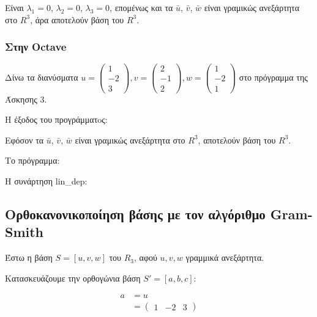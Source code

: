 \documentclass[12pt, fleqn, leqno]{extreport}
\begin{document}
Είναι $\lambda_{1}=0$, $\lambda_{2}=0$, $\lambda_{3}=0$, επομένως και τα $\bar{u}$, $\bar{v}$, $\bar{w}$ είναι γραμικώς ανεξάρτητα στο $R^{3}$, άρα αποτελούν βάση του $R^{3}$.

\newpage
\subsubsection{Στην Octave}

Δίνω τα διανύσματα
$
    u = \begin{pmatrix}
        1 \\ -2 \\ 3
    \end{pmatrix},
    v = \begin{pmatrix}
        2 \\ -1 \\ 2
    \end{pmatrix},
    w = \begin{pmatrix}
        1 \\ -2 \\ 1
    \end{pmatrix}
$
στο πρόγραμμα της Άσκησης 3.

Η έξοδος του προγράμματoς:

Εφόσον τα $\bar{u}$, $\bar{v}$, $\bar{w}$ είναι γραμικώς ανεξάρτητα στο $R^{3}$, αποτελούν βάση του $R^{3}$.

Το πρόγραμμα:


Η συνάρτηση lin\_dep:



\newpage
\subsection{Ορθοκανονικοποίηση βάσης με τον αλγόριθμο Gram-Smith}

Έστω η βάση $S=[u, v, w]$ του $R_{3}$, αφού $u, v, w$ γραμμικά ανεξάρτητα.

Κατασκευάζουμε την ορθογώνια βάση $S'=[a, b, c]$:

\begin{equation}
    \begin{split}
        a &= u
        \\&=
        \begin{pmatrix}
            1 & -2 & 3
        \end{pmatrix}
    \end{split}
\end{equation}
\end{document}
